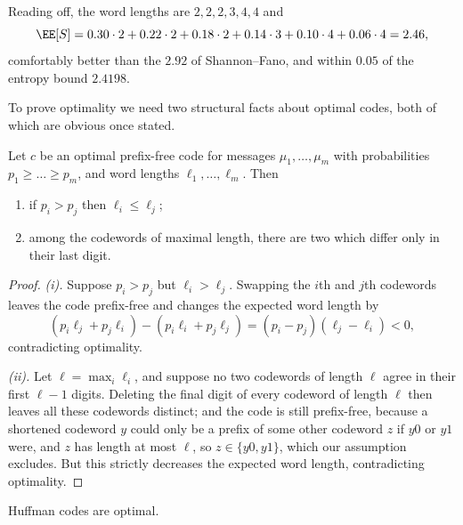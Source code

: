 \begin{example}
	Reading off, the word lengths are $2,2,2,3,4,4$ and
	$$\EE[S] = 0.30\cdot2 + 0.22\cdot2+0.18\cdot2+0.14\cdot3+0.10\cdot4+0.06\cdot4 = 2.46,$$
	comfortably better than the $2.92$ of Shannon--Fano, and within $0.05$ of the entropy bound $2.4198$.
\end{example}

To prove optimality we need two structural facts about optimal codes, both of which are obvious once stated.

\begin{lemma}\label{lem:optprops}
	Let $c$ be an optimal prefix-free code for messages $\mu_1, \dots, \mu_m$ with probabilities $p_1 \ge \dots \ge p_m$, and word lengths $\ell_1, \dots, \ell_m$. Then
	\begin{enumerate}[label=(\roman*)]
		\item if $p_i > p_j$ then $\ell_i \le \ell_j$;
		\item among the codewords of maximal length, there are two which differ only in their last digit.
	\end{enumerate}
\end{lemma}

\begin{proof}
	\emph{(i).} Suppose $p_i > p_j$ but $\ell_i > \ell_j$. Swapping the $i$th and $j$th codewords leaves the code prefix-free and changes the expected word length by
	$$(p_i \ell_j + p_j \ell_i) - (p_i \ell_i + p_j \ell_j) = (p_i - p_j)(\ell_j - \ell_i) < 0,$$
	contradicting optimality.

	\emph{(ii).} Let $\ell = \max_i \ell_i$, and suppose no two codewords of length $\ell$ agree in their first $\ell - 1$ digits. Deleting the final digit of every codeword of length $\ell$ then leaves all these codewords distinct; and the code is still prefix-free, because a shortened codeword $y$ could only be a prefix of some other codeword $z$ if $y0$ or $y1$ were, and $z$ has length at most $\ell$, so $z \in \{y0, y1\}$, which our assumption excludes. But this strictly decreases the expected word length, contradicting optimality.
\end{proof}

\begin{theorem}
	Huffman codes are optimal.
\end{theorem}

